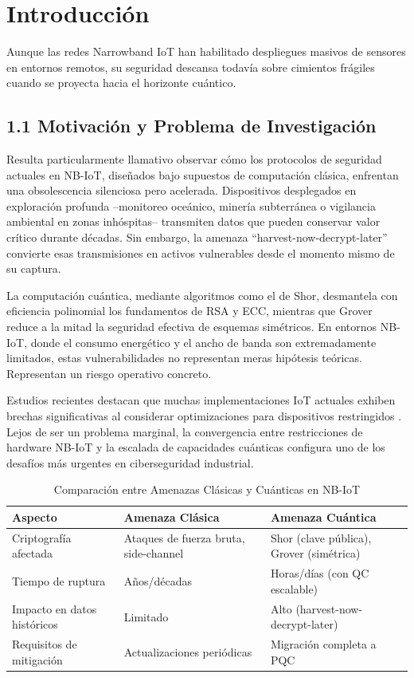 \section{Introducción}

Aunque las redes Narrowband IoT han habilitado despliegues masivos de sensores en entornos remotos, su seguridad descansa todavía sobre cimientos frágiles cuando se proyecta hacia el horizonte cuántico. 

\subsection{1.1 Motivación y Problema de Investigación}

Resulta particularmente llamativo observar cómo los protocolos de seguridad actuales en NB-IoT, diseñados bajo supuestos de computación clásica, enfrentan una obsolescencia silenciosa pero acelerada. Dispositivos desplegados en exploración profunda --monitoreo oceánico, minería subterránea o vigilancia ambiental en zonas inhóspitas-- transmiten datos que pueden conservar valor crítico durante décadas. Sin embargo, la amenaza ``harvest-now-decrypt-later'' convierte esas transmisiones en activos vulnerables desde el momento mismo de su captura.

La computación cuántica, mediante algoritmos como el de Shor, desmantela con eficiencia polinomial los fundamentos de RSA y ECC, mientras que Grover reduce a la mitad la seguridad efectiva de esquemas simétricos. En entornos NB-IoT, donde el consumo energético y el ancho de banda son extremadamente limitados, estas vulnerabilidades no representan meras hipótesis teóricas. Representan un riesgo operativo concreto.

Estudios recientes destacan que muchas implementaciones IoT actuales exhiben brechas significativas al considerar optimizaciones para dispositivos restringidos \cite{Liu2024_PQC_IoT}. Lejos de ser un problema marginal, la convergencia entre restricciones de hardware NB-IoT y la escalada de capacidades cuánticas configura uno de los desafíos más urgentes en ciberseguridad industrial.

\begin{table}[t]
\centering
\caption{Comparación entre Amenazas Clásicas y Cuánticas en NB-IoT}
\label{tab:amenazas}
\begin{tabular}{|l|l|l|}
\hline
\textbf{Aspecto} & \textbf{Amenaza Clásica} & \textbf{Amenaza Cuántica} \\
\hline
Criptografía afectada & Ataques de fuerza bruta, side-channel & Shor (clave pública), Grover (simétrica) \\
\hline
Tiempo de ruptura & Años/décadas & Horas/días (con QC escalable) \\
\hline
Impacto en datos históricos & Limitado & Alto (harvest-now-decrypt-later) \\
\hline
Requisitos de mitigación & Actualizaciones periódicas & Migración completa a PQC \\
\hline
\end{tabular}
\end{table}

